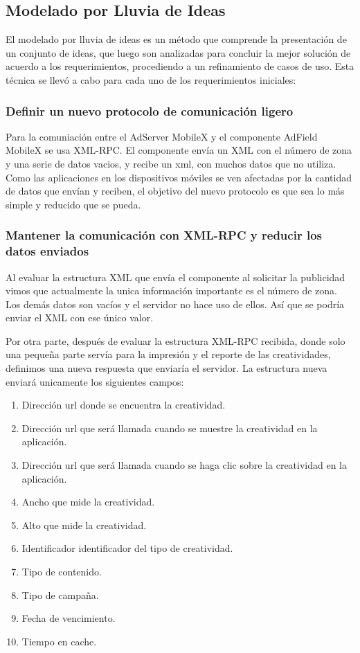 \subsection{Modelado por Lluvia de Ideas}

El modelado por lluvia de ideas es un método que comprende la presentación
de un conjunto de ideas, que luego son analizadas para concluir la
mejor solución de acuerdo a los requerimientos, procediendo a un refinamiento
de casos de uso. Esta técnica se llevó a cabo para cada uno de los
requerimientos iniciales: 


\subsubsection{Definir un nuevo protocolo de comunicación ligero}

Para la comuniación entre el AdServer MobileX y el componente AdField
MobileX se usa XML-RPC. El componente envía un XML con el número de
zona y una serie de datos vacios, y recibe un xml, con muchos datos
que no utiliza. Como las aplicaciones en los dispositivos móviles
se ven afectadas por la cantidad de datos que envían y reciben, el
objetivo del nuevo protocolo es que sea lo más simple y reducido que
se pueda.


\subsubsection*{Mantener la comunicación con XML-RPC y reducir los datos enviados}

Al evaluar la estructura XML que envía el componente al solicitar
la publicidad vimos que actualmente la unica información importante
es el número de zona. Los demás datos son vacíos y el servidor no
hace uso de ellos. Así que se podría enviar el XML con ese único valor.

Por otra parte, después de evaluar la estructura XML-RPC recibida,
donde solo una pequeña parte servía para la impresión y el reporte
de las creatividades, definimos una nueva respuesta que enviaría el
servidor. La estructura nueva enviará unicamente los siguientes campos: 
\begin{enumerate}
\item Dirección url donde se encuentra la creatividad.
\item Dirección url que será llamada cuando se muestre la creatividad en
la aplicación.
\item Dirección url que será llamada cuando se haga clic sobre la creatividad
en la aplicación.
\item Ancho que mide la creatividad.
\item Alto que mide la creatividad.
\item Identificador identificador del tipo de creatividad.
\item Tipo de contenido.
\item Tipo de campaña.
\item Fecha de vencimiento.
\item Tiempo en cache.
\end{enumerate}

